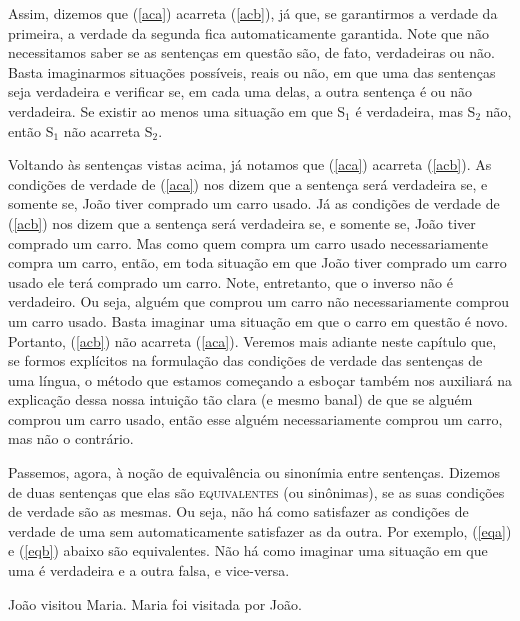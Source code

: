 Assim, dizemos que (\ref{aca}) acarreta (\ref{acb}), já que, se
garantirmos a verdade da primeira, a verdade da segunda fica
automaticamente garantida. Note que não necessitamos saber se as
sen\-ten\-ças em questão são, de fato, verdadeiras ou não. Basta
imaginarmos situa\-çõ\-es possíveis, reais ou não, em que uma das
sen\-ten\-ças seja verdadeira e verificar se, em cada uma delas, a
outra sentença é ou não verdadeira. Se existir ao menos uma
situa\-ção em que S$_{1}$ é verdadeira, mas S$_{2}$ não, então S$_{1}$
não acarreta S$_{2}$.

 Voltando às sen\-ten\-ças vistas acima, já notamos
que (\ref{aca}) acarreta (\ref{acb}). As condi\-çõ\-es de verdade
de (\ref{aca}) nos dizem que a sentença será verdadeira se, e
somente se, João tiver comprado um carro usado. Já as
condi\-çõ\-es de verdade de (\ref{acb}) nos dizem que a sentença
será verdadeira se, e somente se, João tiver comprado um carro.
Mas como quem compra um carro usado necessariamente compra um
carro, então, em toda situa\-ção em que João tiver comprado um
carro usado ele terá comprado um carro. Note, entretanto, que o
inverso não é verdadeiro. Ou seja, alguém que comprou um carro não
necessariamente comprou um carro usado. Basta imaginar uma
situa\-ção em que o carro em questão é novo. Portanto, (\ref{acb})
não acarreta (\ref{aca}). Veremos mais adiante neste capítulo que,
se formos explícitos na formulação das condições de verdade das
sentenças de uma língua, o método que estamos começando a esboçar
também nos auxiliará na explicação dessa nossa intuição tão clara
(e mesmo banal) de que se alguém comprou um carro usado, então
esse alguém necessariamente comprou um carro, mas não o contrário.

Passemos, agora, à no\-ção de equivalência ou sinonímia entre
sen\-ten\-ças. Dizemos de duas sen\-ten\-ças que elas são
\textsc{equivalentes} (ou sinônimas), se as suas condi\-çõ\-es de
verdade são as mesmas. Ou seja, não há como satisfazer as condições de verdade de uma
sem automaticamente satisfazer as da outra. Por exemplo,
(\ref{eqa}) e (\ref{eqb}) abaixo são equivalentes. Não há como
imaginar uma situa\-ção em que uma é verdadeira e a outra falsa, e
vice-versa.


\begin{exe}
    \ex\label{eq}
    \begin{xlist}
        \ex  João visitou Maria.\label{eqa}
        \ex  Maria foi visitada por João.\label{eqb}
    \end{xlist}
\end{exe}



